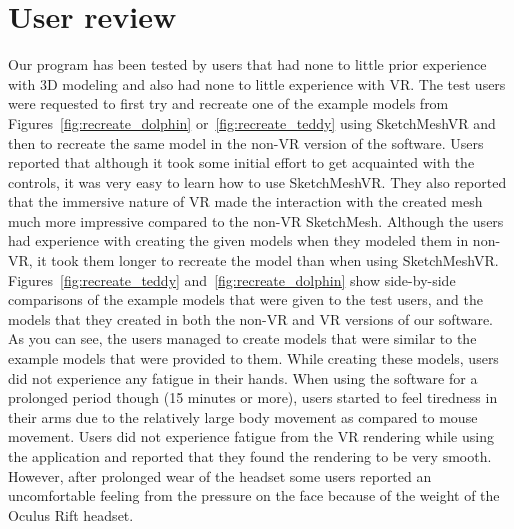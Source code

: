 \section{User review}
Our program has been tested by users that had none to little prior experience with 3D modeling and also had none to little experience with VR. The test users were requested to first try and recreate one of the example models from Figures~\ref{fig:recreate_dolphin} or~\ref{fig:recreate_teddy} using SketchMeshVR and then to recreate the same model in the non-VR version of the software. Users reported that although it took some initial effort to get acquainted with the controls, it was very easy to learn how to use SketchMeshVR. They also reported that the immersive nature of VR made the interaction with the created mesh much more impressive compared to the non-VR SketchMesh. Although the users had experience with creating the given models when they modeled them in non-VR, it took them longer to recreate the model than when using SketchMeshVR. Figures~\ref{fig:recreate_teddy} and~\ref{fig:recreate_dolphin} show side-by-side comparisons of the example models that were given to the test users, and the models that they created in both the non-VR and VR versions of our software. As you can see, the users managed to create models that were similar to the example models that were provided to them. While creating these models, users did not experience any fatigue in their hands. When using the software for a prolonged period though (15 minutes or more), users started to feel tiredness in their arms due to the relatively large body movement as compared to mouse movement. Users did not experience fatigue from the VR rendering while using the application and reported that they found the rendering to be very smooth. However, after prolonged wear of the headset some users reported an uncomfortable feeling from the pressure on the face because of the weight of the Oculus Rift headset. 


